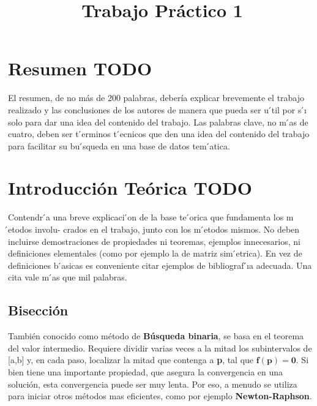 \documentclass[a4paper]{article}
\title{Trabajo Práctico 1}
\begin{document}
\maketitle
\newpage

\tableofcontents


\newpage
\section{Resumen TODO}
El resumen, de no más de 200 palabras, debería explicar brevemente el trabajo realizado y las conclusiones de los autores de manera que pueda ser u ́til por s ́ı solo para dar una idea del contenido del trabajo. Las palabras clave, no m ́as de cuatro, deben ser t ́erminos t ́ecnicos que den una idea del contenido del trabajo para facilitar su bu ́squeda en una base de datos tem ́atica.

\section{Introducción Teórica TODO}
Contendr ́a una breve explicaci ́on de la base te ́orica que fundamenta los m ́etodos involu- crados en el trabajo, junto con los m ́etodos mismos. No deben incluirse demostraciones de propiedades ni teoremas, ejemplos innecesarios, ni definiciones elementales (como por ejemplo la de matriz sim ́etrica). En vez de definiciones b ́asicas es conveniente citar ejemplos de bibliograf ́ıa adecuada. Una cita vale m ́as que mil palabras.
\\

\subsection{Bisección}
También conocido como método de \textbf{Búsqueda binaria}, se basa en el teorema del valor intermedio. 
Requiere dividir varias veces a la mitad los subintervalos de [a,b] y, en cada paso, localizar la mitad que contenga a \textbf{p}, tal que $\mathbf{f(p) = 0}$.
Si bien tiene una importante propiedad, que asegura la convergencia en una solución, esta convergencia puede ser muy lenta. Por eso, a menudo se utiliza para iniciar otros métodos mas eficientes, como por ejemplo \textbf{Newton-Raphson}.
\end{document}
